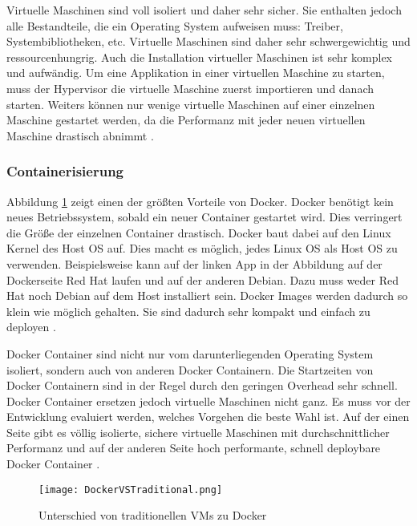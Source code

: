 Virtuelle Maschinen sind voll isoliert und daher sehr sicher. Sie enthalten jedoch alle Bestandteile, die ein Operating System aufweisen muss: Treiber, Systembibliotheken, etc.
Virtuelle Maschinen sind daher sehr schwergewichtig und ressourcenhungrig. Auch die Installation virtueller Maschinen ist sehr komplex und aufwändig. Um eine Applikation in einer virtuellen Maschine zu starten, muss der Hypervisor die virtuelle Maschine zuerst importieren und danach starten. Weiters können nur wenige virtuelle Maschinen auf einer einzelnen Maschine gestartet werden, da die Performanz mit jeder neuen virtuellen Maschine drastisch abnimmt \cite{DevelopingWithDocker}.

\subsubsection{Containerisierung}
Abbildung \ref{fig:DOC_DockerVSTraditional} zeigt einen der größten Vorteile von Docker. Docker benötigt kein neues Betriebssystem, sobald ein neuer Container gestartet wird. Dies verringert die Größe der einzelnen Container drastisch. Docker baut dabei auf den Linux Kernel des Host OS auf. Dies macht es möglich, jedes Linux OS als Host OS zu verwenden. Beispielsweise kann auf der linken App in der Abbildung auf der Dockerseite Red Hat laufen und auf der anderen Debian. Dazu muss weder Red Hat noch Debian auf dem Host installiert sein.
Docker Images werden dadurch so klein wie möglich gehalten. Sie sind dadurch sehr kompakt und einfach zu deployen \cite{MasteringDocker}.

Docker Container sind nicht nur vom darunterliegenden Operating System isoliert, sondern auch von anderen Docker Containern. Die Startzeiten von Docker Containern sind in der Regel durch den geringen Overhead sehr schnell. Docker Container ersetzen jedoch virtuelle Maschinen nicht ganz. Es muss vor der Entwicklung evaluiert werden, welches Vorgehen die beste Wahl ist. Auf der einen Seite gibt es völlig isolierte, sichere virtuelle Maschinen mit durchschnittlicher Performanz und auf der anderen Seite hoch performante, schnell deploybare Docker Container \cite{DevelopingWithDocker}.

\begin{figure}[H]
	\begin{center}
		\texttt{[image: DockerVSTraditional.png]}
		\caption[Unterschied von traditionellen VMs zu Docker]{Unterschied von traditionellen VMs zu Docker \cite{MasteringDocker}}
		\label{fig:DOC_DockerVSTraditional}
	\end{center}
\end{figure}

